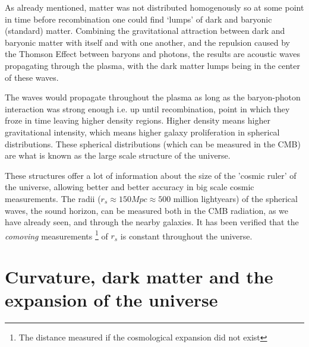 As already mentioned, matter was not distributed homogenously so at some point in time before recombination one could find `lumps' of dark and baryonic (standard) matter. Combining the gravitational attraction between dark and baryonic matter with itself and with one another, and the repulsion caused by the Thomson Effect between baryons and photons, the results are acoustic waves propagating through the plasma, with the dark matter lumps being in the center of these waves. 

The waves would propagate throughout the plasma as long as the baryon-photon interaction was strong enough i.e. up until recombination, point in which they froze in time leaving higher density regions. Higher density means higher gravitational intensity, which means higher galaxy proliferation in spherical distributions. These spherical distributions (which can be measured in the CMB) are what is known as the large scale structure of the universe.

These structures offer a lot of information about the size of the 'cosmic ruler' of the universe, allowing better and better accuracy in big scale cosmic measurements. The radii ($r_s \approx 150 Mpc \approx 500 $ million lightyears) of the spherical waves, the sound horizon, can be measured both in the CMB radiation, as we have already seen, and through the nearby galaxies. It has been verified that the \textit{comoving} measurements \footnote{The distance measured if the cosmological expansion did not exist} of $r_s$ is constant throughout the universe.

\section{Curvature, dark matter and the expansion of the universe}

